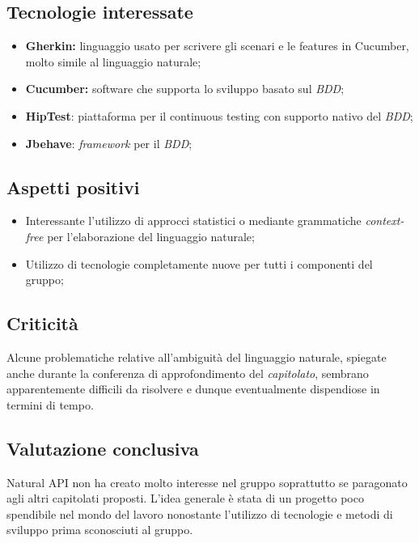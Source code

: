 \subsection{Tecnologie interessate}
\begin{itemize}
	\item \textbf{Gherkin:} linguaggio usato per scrivere gli scenari e le features in Cucumber, molto simile al linguaggio naturale; 
	\item \textbf{Cucumber:} software che supporta lo sviluppo basato sul \textit{BDD\glos};
	\item \textbf{HipTest}: piattaforma per il continuous testing con supporto nativo del \textit{BDD\glos};
	\item \textbf{Jbehave}: \textit{framework\glo} per il \textit{BDD\glos};
\end{itemize}

\subsection{Aspetti positivi}

\begin{itemize}
	\item Interessante l'utilizzo di approcci statistici o mediante grammatiche \textit{context-free\glo} per l'elaborazione del linguaggio naturale;
	\item Utilizzo di tecnologie completamente nuove per tutti i componenti del gruppo;
\end{itemize}


\subsection{Criticità}
Alcune problematiche relative all'ambiguità del linguaggio naturale, spiegate anche durante la conferenza di approfondimento del \textit{capitolato\glos}, sembrano apparentemente difficili da risolvere e dunque eventualmente dispendiose in termini di tempo.


\subsection{Valutazione conclusiva}
Natural API non ha creato molto interesse nel gruppo soprattutto se paragonato agli altri capitolati proposti. L'idea generale è stata di un progetto poco spendibile nel mondo del lavoro nonostante l'utilizzo di tecnologie e metodi di sviluppo prima sconosciuti al gruppo.
